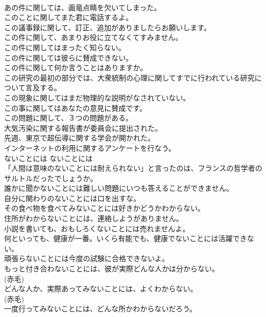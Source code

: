 \documentclass[8pt]{extreport}
\begin{document}
\begin{CJK}{UTF8}{min}
\\	あの件に関しては、画竜点睛を欠いてしまった。   
\\	このことに関してまた君に電話するよ。   
\\	この議事録に関して、訂正、追加がありましたらお願いします。   
\\	この件に関して、あまりお役に立てなくてすみません。   
\\	この件に関してはまったく知らない。   
\\	この件に関しては彼らに賛成できない。   
\\	この件に関して何か言うことはありますか。   
\\	この研究の最初の部分では、大衆統制の心理に関してすでに行われている研究について言及する。   
\\	この現象に関してはまだ物理的な説明がなされていない。   
\\	この事に関してはあなたの意見に賛成です。   
\\	この問題に関して、３つの問題がある。   
\\	大気汚染に関する報告書が委員会に提出された。  
\\	先週、東京で超伝導に関する学会が開かれた。  
\\	インターネットの利用に関するアンケートを行なう。  
\\	ないことには	ないことには	
\\	「人間は意味のないことには耐えられない」と言ったのは、フランスの哲学者のサルトルだったでしょうか｡　  
\\	誰かに聞かないことには難しい問題にいつも答えることができません。  
\\	自分に関わりのないことには口を出すな。  
\\	その食べ物を食べてみないことには好きかどうかわからない。  
\\	住所がわからないことには、連絡しようがありません。   
\\	小説を書いても、おもしろくないことには売れませんよ。   
\\	何といっても、健康が一番。いくら有能でも、健康でないことには活躍できない。  
\\	頑張らないことには今度の試験に合格できないよ。  
\\	もっと付き合わないことには、彼が実際どんな人かは分からない。  
\\	(赤毛)
\\	どんな人か、実際あってみないことには、よくわからない。  
\\	(赤毛)
\\	一度行ってみないことには、どんな所かわからないだろう。  

\end{CJK}
\end{document}

